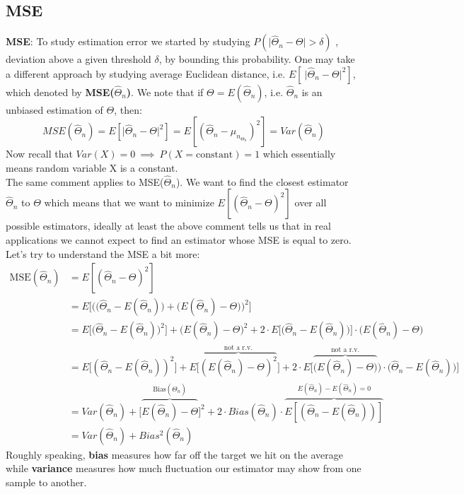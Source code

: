 \documentclass[14pt,twoside,a4paper,fleqn]{article}
\theoremstyle{plain}
\begin{document}
\subsection{MSE} 
\textbf{MSE}: To study estimation error we started by studying $P(\vert \hat{\Theta}_n - \Theta\vert > \delta)$ , deviation above a given threshold $\delta$, by bounding this probability. One may take a different approach by studying average Euclidean distance, i.e. $E[\ \vert\hat{\Theta}_n - \Theta\vert ^2]$, which denoted by \textbf{MSE($\hat{\Theta}_n$)}.\newline
We note that if $\Theta = E(\hat{\Theta}_n)$, i.e. $\hat{\Theta}_n$ is an unbiased estimation of $\Theta$, then: 
$$MSE(\hat{\Theta}_n) = E[\vert\hat{\Theta}_n - \Theta\vert^2] = E[(\hat{\Theta}_n - \mu _{n_{\Theta _n}})^2] = Var(\hat{\Theta}_n)$$
Now recall that $Var(X) = 0\  \implies \ P(X = \text{constant}) = 1$ which essentially means random variable X is a constant.\\
The same comment applies to MSE($\hat{\Theta}_n$). We want to find the closest estimator $\hat{\Theta}_n$ to $\Theta$ which means that we want to minimize $E[(\hat{\Theta}_n - \Theta)^2]$ over all possible estimators, ideally at least the above comment tells us that in real applications we cannot expect to find an estimator whose MSE is equal to zero. Let's try to understand the MSE a bit more:
\begin{equation*}
\begin{split}
\text{MSE}(\hat{\Theta}_n) &= E[(\hat{\Theta}_n - \Theta)^2]\\
	&= E\Big[\Big(\big(\hat{\Theta}_n - E(\hat{\Theta}_n)\big) + \big(E(\hat{\Theta}_n) - \Theta\big) \Big)^2 \Big]\\
	&= E\big[\big(\hat{\Theta}_n - E(\hat{\Theta}_n)\big)^2\big] + \big(E(\hat{\Theta}_n) - \Theta\big)^2 + 2 \cdot E\big[\big(\hat{\Theta}_n - E(\hat{\Theta}_n)\big)\big]\cdot \big(E(\hat{\Theta}_n) - \Theta\big)\\
	&= E\big[(\hat{\Theta}_n - E(\hat{\Theta}_n))^2\big] + E\big[\overbrace{(E(\hat{\Theta}_n) - \Theta)^2}^{\text{not a r.v.}}\big]
		+2\cdot E\Big[\overbrace{\big(E(\hat{\Theta}_n) - \Theta)}^{\text{not a r.v.}}\big)\cdot \big(\hat{\Theta}_n - E(\hat{\Theta}_n)\big) \Big]\\
		&= Var(\hat{\Theta}_n) + \big[\overbrace{E(\hat{\Theta}_n) - \Theta}^{\text{Bias$(\hat{\Theta}_n)$}}\big]^2 + 2\cdot Bias(\hat{\Theta}_n)\cdot \overbrace{E[(\hat{\Theta}_n - E(\hat{\Theta}_n))]}^{E(\hat{\Theta}_n) - E(\hat{\Theta}_n) = 0}\\
		&= Var(\hat{\Theta}_n) + Bias^2(\hat{\Theta}_n)
\end{split}
\end{equation*}
Roughly speaking, \textbf{bias} measures how far off the target we hit on the average while \textbf{variance} measures how much fluctuation our estimator may show from one sample to another.
\end{document}
